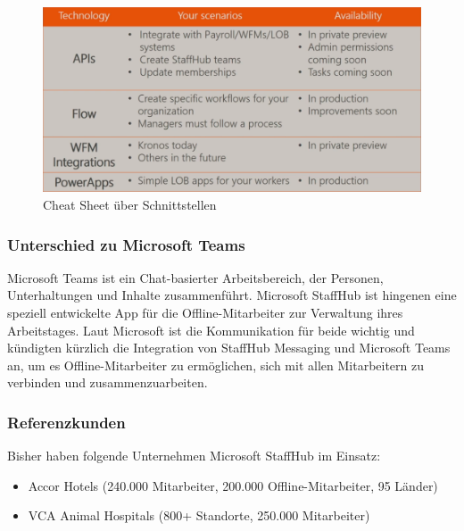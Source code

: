 \begin{figure}[H] 
\centering 
\includegraphics[scale=0.42]{images/msapi} 
\caption[Cheat Sheet über Schnittstellen]{Cheat Sheet über Schnittstellen\protect} 
\label{ws} 
\end{figure}

\subsubsection{Unterschied zu Microsoft Teams}
Microsoft Teams ist ein Chat-basierter Arbeitsbereich, der Personen, Unterhaltungen und Inhalte zusammenführt. Microsoft StaffHub ist hingenen eine speziell entwickelte App für die Offline-Mitarbeiter zur Verwaltung ihres Arbeitstages. Laut Microsoft ist die Kommunikation für beide wichtig und kündigten kürzlich die Integration von StaffHub Messaging und Microsoft Teams an, um es Offline-Mitarbeiter zu ermöglichen, sich mit allen Mitarbeitern zu verbinden und zusammenzuarbeiten.

\subsubsection{Referenzkunden}
Bisher haben folgende Unternehmen Microsoft StaffHub im Einsatz: 

\begin{itemize}
\item Accor Hotels (240.000 Mitarbeiter, 200.000 Offline-Mitarbeiter, 95 Länder)
\item VCA Animal Hospitals (800+ Standorte, 250.000 Mitarbeiter)
\end{itemize}
 

